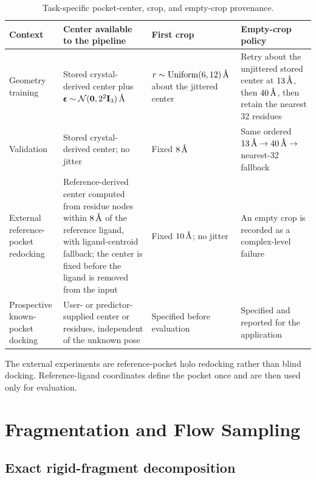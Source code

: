 \documentclass{article}
\renewcommand{\boldsymbol}[1]{\pmb{#1}}
\newcommand{\angstrom}{\text{\normalfont\AA}}
\begin{document}
\begin{table}[htbp]
    \centering
    \small
    \caption{Task-specific pocket-center, crop, and empty-crop provenance.}
    \label{tab:si_pocket_contract}
    \begin{tabularx}{\textwidth}{@{}>{\raggedright\arraybackslash}p{}*{3}{>{\raggedright\arraybackslash}X}@{}}
        \toprule
        Context & Center available to the pipeline & First crop & Empty-crop policy \\
        \midrule
        Geometry training & Stored crystal-derived center plus $\boldsymbol{\epsilon}\sim\mathcal{N}(\mathbf{0}, 2^2\mathbf{I}_3)\,\angstrom$ & $r\sim\mathrm{Uniform}(6,12)\,\angstrom$ about the jittered center & Retry about the unjittered stored center at $13\,\angstrom$, then $40\,\angstrom$, then retain the nearest 32 residues \\
        Validation & Stored crystal-derived center; no jitter & Fixed $8\,\angstrom$ & Same ordered $13\,\angstrom\rightarrow 40\,\angstrom\rightarrow$ nearest-32 fallback \\
        External reference-pocket redocking & Reference-derived center computed from residue nodes within $8\,\angstrom$ of the reference ligand, with ligand-centroid fallback; the center is fixed before the ligand is removed from the input & Fixed $10\,\angstrom$; no jitter & An empty crop is recorded as a complex-level failure \\
        Prospective known-pocket docking & User- or predictor-supplied center or residues, independent of the unknown pose & Specified before evaluation & Specified and reported for the application \\
        \bottomrule
    \end{tabularx}
\end{table}

The external experiments are reference-pocket holo redocking rather than blind docking.
Reference-ligand coordinates define the pocket once and are then used only for evaluation.

\section{Fragmentation and Flow Sampling}
\label{si:fragmentation_sampling}

\subsection{Exact rigid-fragment decomposition}
\label{si:fragment_algorithm}
\end{document}
